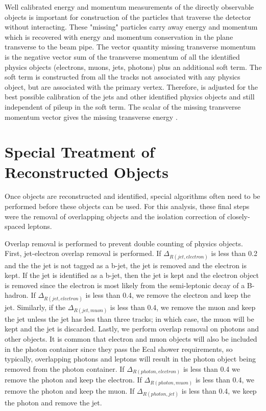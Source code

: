 Well calibrated energy and momentum measurements of the directly observable objects is important for construction of the particles that traverse the detector without interacting.  These "missing" particles carry away energy and momentum which is recovered with energy and momentum conservation in the plane transverse to the beam pipe.  The vector quantity missing transverse momentum \pt{} is the negative vector sum of the transverse momentum of all the identified physics objects (electrons, muons, jets, photons) plus an additional soft term.  The soft term is constructed from all the tracks not associated with any physics object, but are associated with the primary vertex.  Therefore, \met{} is adjusted for the best possible calibration of the jets and other identified physics objects and still independent of pileup in the soft term.  The scalar of the missing transverse momentum vector gives the missing transverse energy \met. 

\section{Special Treatment of Reconstructed Objects}
\label{sec:obj:treat}
Once objects are reconstructed and identified, special algorithms often need to be performed before these objects can be used.  For this analysis, these final steps were the removal of overlapping objects and the isolation correction of closely-spaced leptons.

Overlap removal is performed to prevent double counting of physics objects. First, jet-electron overlap removal is performed.  If $\Delta_{R(jet, electron)}$ is less than 0.2 and the the jet is not tagged as a b-jet, the jet is removed and the electron is kept.  If the jet is identified as a b-jet, then the jet is kept and the electron object is removed since the electron is most likely from the semi-leptonic decay of a B-hadron.  If $\Delta_{R(jet, electron)}$ is less than 0.4, we remove the electron and keep the jet.  Similarly, if the $\Delta_{R(jet, muon)}$ is less than 0.4, we remove the muon and keep the jet unless the jet has less than three tracks; in which case, the muon will be kept and the jet is discarded.  Lastly, we perform overlap removal on photons and other objects.  It is common that electron and muon objects will also be included in the photon container since they pass the Ecal shower requirements, so typically, overlapping photons and leptons will result in the photon object being removed from the photon container.  If $\Delta_{R(photon, electron)}$ is less than 0.4 we remove the photon and keep the electron.  If $\Delta_{R(photon, muon)}$ is less than 0.4, we remove the photon and keep the muon.  If $\Delta_{R(photon, jet)}$ is less than 0.4, we keep the photon and remove the jet.  

